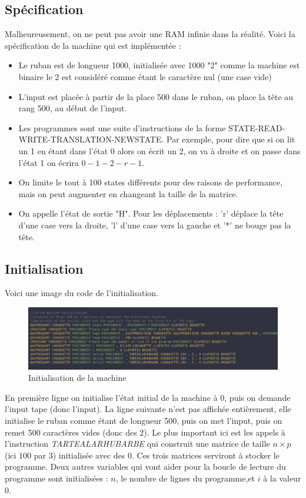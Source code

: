 \documentclass[11pt,colorlinks=true,a4paper]{article}
\begin{document}
    \subsection{Spécification}
    Malheureusement, on ne peut pas avoir une RAM infinie dans la réalité. Voici la spécification de la machine qui est implémentée :
    \begin{itemize}
        \item Le ruban est de longueur 1000, initialisée avec 1000 "2" comme la machine est binaire le 2 est considéré comme étant le caractère 
        nul (une case vide)
        \item L'input est placée à partir de la place 500 dans le ruban, on place la tête au rang 500, au début de l'input.
        \item Les programmes sont une suite d'instructions de la forme STATE-READ-WRITE-TRANSLATION-NEWSTATE. Par exemple, pour dire 
        que si on lit un 1 en étant dans l'état 0 alors on écrit un 2, on va à droite et on passe dans l'état 1 on écrira $0-1-2-r-1$.
        \item On limite le tout à 100 states différents pour des raisons de performance, mais on peut augmenter en changeant la taille de la matrice.
        \item On appelle l'état de sortie "H". Pour les déplacements : 'r' déplace la tête d'une case vers la droite, 'l' d'une case 
        vers la gauche et '*' ne bouge pas la tête.
    \end{itemize}
    \subsection{Initialisation}
    Voici une image du code de l'initialisation.
    \begin{figure}[H]
        \begin{center}
        \includegraphics[width=\textwidth]{img/init.png}
        \caption{Initialisation de la machine}
        \end{center}
    \end{figure}
    En première ligne on initialise l'état initial de la machine à 0, puis on demande l'input tape (donc l'input). La ligne suivante n'est 
    pas affichée entièrement, elle initialise le ruban comme étant de longueur 500, puis on met l'input, puis on remet 500 caractères vides (donc des 2).
    Le plus important ici est les appels à l'instruction \textit{TARTEALARHUBARBE} qui construit une matrice de taille $n\times p$ (ici 100 par 3) initialisée 
    avec des 0. Ces trois matrices serviront à stocker le programme.
    Deux autres variables qui vont aider pour la boucle de lecture du programme sont initialisées : $n$, le nombre de lignes du programme,et $i$ à la valeur 0. 
\end{document}

